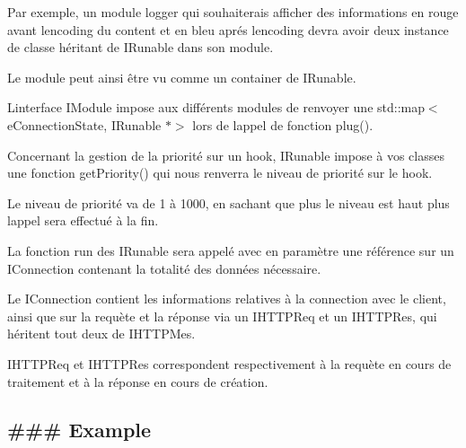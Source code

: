 Par exemple, un module logger qui souhaiterais afficher des informations en rouge avant l\textquotesingle{}encoding du content et en bleu aprés l\textquotesingle{}encoding devra avoir deux instance de classe héritant de I\+Runable dans son module.

Le module peut ainsi être vu comme un container de I\+Runable.

L\textquotesingle{}interface I\+Module impose aux différents modules de renvoyer une std\+::map$<$e\+Connection\+State, I\+Runable $\ast$$>$ lors de l\textquotesingle{}appel de fonction plug().

Concernant la gestion de la priorité sur un hook, I\+Runable impose à vos classes une fonction get\+Priority() qui nous renverra le niveau de priorité sur le hook.

Le niveau de priorité va de 1 à 1000, en sachant que plus le niveau est haut plus l\textquotesingle{}appel sera effectué à la fin.

La fonction run des I\+Runable sera appelé avec en paramètre une référence sur un I\+Connection contenant la totalité des données nécessaire.

Le I\+Connection contient les informations relatives à la connection avec le client, ainsi que sur la requète et la réponse via un I\+H\+T\+T\+P\+Req et un I\+H\+T\+T\+P\+Res, qui héritent tout deux de I\+H\+T\+T\+P\+Mes.

I\+H\+T\+T\+P\+Req et I\+H\+T\+T\+P\+Res correspondent respectivement à la requète en cours de traitement et à la réponse en cours de création.

\subsection*{\#\#\# Example }